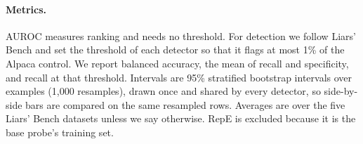 \paragraph{Metrics.} AUROC measures ranking and needs no threshold. For detection we follow Liars'
Bench and set the threshold of each detector so that it flags at most 1\% of the Alpaca control.
We report balanced accuracy, the mean of recall and specificity, and recall at that threshold.
Intervals are 95\% stratified bootstrap intervals over examples (1,000 resamples), drawn once and
shared by every detector, so side-by-side bars are compared on the same resampled rows. Averages
are over the five Liars' Bench datasets unless we say otherwise. RepE is excluded because it is the
base probe's training set.
